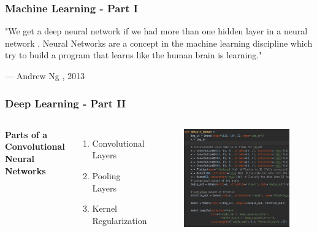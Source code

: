 \documentclass{beamer}
\begin{document}
%
\begin{frame}
\frametitle{Machine Learning - Part I}
\epigraph{"We get a deep neural network if we had more than one hidden layer in a neural network . Neural Networks are a concept in the machine learning discipline which try to build a program that learns like the human brain is learning."}{--- \textup{Andrew Ng }, 2013}
\end{frame}
%
%
\begin{frame}
\frametitle{Deep Learning - Part II}
\begin{columns}[c] 
\textbf{Parts of a Convolutional Neural Networks}
\begin{enumerate}
\item Convolutional Layers
\item Pooling Layers
\item Kernel Regularization
\end{enumerate}
\begin{figure}
\includegraphics[width=1.05\linewidth]{photo/code.png}
\end{figure}
\end{columns}
\end{frame}
\end{document}
